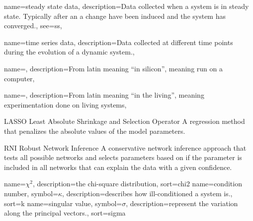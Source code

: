 {
  name={steady state data},
  description={Data collected when a system is in steady state. Typically after an a change have been induced and the system has converged.},
  see={ss},
}

{
  name={time series data},
  description={Data collected at different time points during the evolution of a dynamic system.},
}

{
  name={\insilico},
  description={From latin meaning ``in silicon'', meaning run on a computer},
}

{
  name={\invivo},
  description={From latin meaning ``in the living'', meaning experimentation done on living systems},
}

{LASSO}
{Least Absolute Shrinkage and Selection Operator}
{A regression method that penalizes the absolute values of the model parameters.\cite{Tibshirani1996}}

{RNI}
{Robust Network Inference}
{A conservative network inference approach that tests all possible networks and selects parameters based on if the parameter is included in all networks that can explain the data with a given confidence\cite{Nordling2013phdthesis}.}

{
  name={\ensuremath{\chi^2}},
  description={the chi-square distribution},
  sort=chi2
}
{
  name={condition number},
  symbol={\ensuremath{\kappa}},
  description={describes how ill-conditioned a system is.},
  sort=k
}
{
  name={singular value},
  symbol={\ensuremath{\sigma}},
  description={represent the variation along the principal vectors.},
  sort=sigma
}